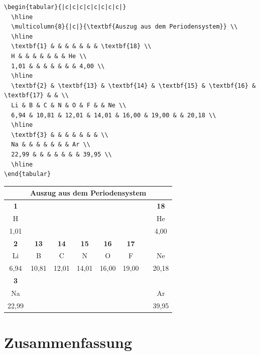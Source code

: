 \documentclass[12pt,a4paper]{article}
\begin{document}
\begin{lstlisting}[style=latex]
\begin{tabular}{|c|c|c|c|c|c|c|c|}
  \hline
  \multicolumn{8}{|c|}{\textbf{Auszug aus dem Periodensystem}} \\
  \hline
  \textbf{1} & & & & & & & \textbf{18} \\
  H & & & & & & & He \\
  1,01 & & & & & & & 4,00 \\
  \hline
  \textbf{2} & \textbf{13} & \textbf{14} & \textbf{15} & \textbf{16} & \textbf{17} & & \\
  Li & B & C & N & O & F & & Ne \\
  6,94 & 10,81 & 12,01 & 14,01 & 16,00 & 19,00 & & 20,18 \\
  \hline
  \textbf{3} & & & & & & & \\
  Na & & & & & & & Ar \\
  22,99 & & & & & & & 39,95 \\
  \hline
\end{tabular}
\end{lstlisting}

\begin{ausgabe}
\begin{center}
\begin{tabular}{|c|c|c|c|c|c|c|c|}
  \hline
  \multicolumn{8}{|c|}{\textbf{Auszug aus dem Periodensystem}} \\
  \hline
  \textbf{1} & & & & & & & \textbf{18} \\
  H & & & & & & & He \\
  1,01 & & & & & & & 4,00 \\
  \hline
  \textbf{2} & \textbf{13} & \textbf{14} & \textbf{15} & \textbf{16} & \textbf{17} & & \\
  Li & B & C & N & O & F & & Ne \\
  6,94 & 10,81 & 12,01 & 14,01 & 16,00 & 19,00 & & 20,18 \\
  \hline
  \textbf{3} & & & & & & & \\
  Na & & & & & & & Ar \\
  22,99 & & & & & & & 39,95 \\
  \hline
\end{tabular}
\end{center}
\end{ausgabe}

\section{Zusammenfassung}
\end{document}
